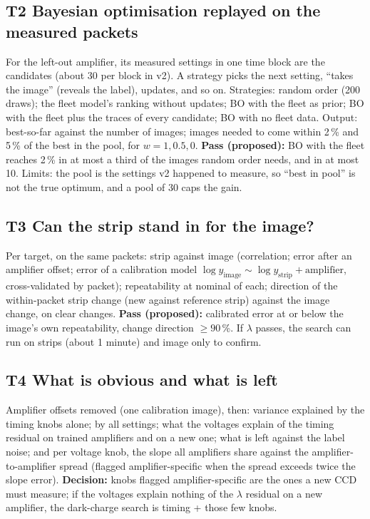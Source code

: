 \documentclass[11pt]{article}
\begin{document}
\subsection*{T2 Bayesian optimisation replayed on the measured packets}
For the left-out amplifier, its measured settings in one time block are the candidates (about 30 per block in v2). A
strategy picks the next setting, ``takes the image'' (reveals the label), updates, and so on. Strategies: random order
(200 draws); the fleet model's ranking without updates; BO with the fleet as prior; BO with the fleet plus the traces of
every candidate; BO with no fleet data. Output: best-so-far against the number of images; images needed to come within
2\,\% and 5\,\% of the best in the pool, for $w = 1, 0.5, 0$. \textbf{Pass (proposed):} BO with the fleet reaches 2\,\%
in at most a third of the images random order needs, and in at most 10. Limits: the pool is the settings v2 happened to
measure, so ``best in pool'' is not the true optimum, and a pool of 30 caps the gain.

\subsection*{T3 Can the strip stand in for the image?}
Per target, on the same packets: strip against image (correlation; error after an amplifier offset; error of a
calibration model $\log y_\text{image} \sim \log y_\text{strip} + \text{amplifier}$, cross-validated by packet);
repeatability at nominal of each; direction of the within-packet strip change (new against reference strip) against the
image change, on clear changes. \textbf{Pass (proposed):} calibrated error at or below the image's own repeatability,
change direction $\ge 90$\,\%. If $\lambda$ passes, the search can run on strips (about 1 minute) and image only to
confirm.

\subsection*{T4 What is obvious and what is left}
Amplifier offsets removed (one calibration image), then: variance explained by the timing knobs alone; by all settings;
what the voltages explain of the timing residual on trained amplifiers and on a new one; what is left against the label
noise; and per voltage knob, the slope all amplifiers share against the amplifier-to-amplifier spread (flagged
amplifier-specific when the spread exceeds twice the slope error). \textbf{Decision:} knobs flagged amplifier-specific
are the ones a new CCD must measure; if the voltages explain nothing of the $\lambda$ residual on a new amplifier, the
dark-charge search is timing + those few knobs.
\end{document}
